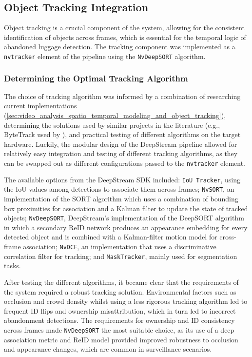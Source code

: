 \subsection{Object Tracking Integration}
\label{sec:object_tracking_integration}

Object tracking is a crucial component of the system, allowing for the
consistent identification of objects across frames, which is essential for the
temporal logic of abandoned luggage detection. The tracking component was
implemented as a \texttt{nvtracker} element of the pipeline using the
\texttt{NvDeepSORT} algorithm.

\subsubsection{Determining the Optimal Tracking Algorithm}
\label{sec:tracker_selection}

The choice of tracking algorithm was informed by a combination of researching
current implementations
(\ref{sec:video_analysis_spatio_temporal_modeling_and_object_tracking}),
determining the solutions used by similar projects in the literature (e.g.,
ByteTrack \citep{zhang2022bytetrack} used by \citet{abandoned2025vrsalovic}),
and practical testing of different algorithms on the target hardware. Luckily,
the modular design of the DeepStream pipeline allowed for relatively easy
integration and testing of different tracking algorithms, as they can be
swapped out as different configurations passed to the \texttt{nvtracker}
element.

The available options from the DeepStream SDK included: \texttt{IoU Tracker},
using the IoU values among detections to associate them across frames;
\texttt{NvSORT}, an implementation of the SORT algorithm
\citep{bewley2016simple} which uses a combination of bounding box proximities
for association and a Kalman filter to update the state of tracked objects;
\texttt{NvDeepSORT}, DeepStream's implementation of the DeepSORT algorithm
\citep{wojke2017simple} in which a secondary ReID network produces an
appearance embedding for every detected object and is combined with a
Kalman-filter motion model for cross-frame association; \texttt{NvDCF}, an
implementation that uses a discriminative correlation filter for tracking; and
\texttt{MaskTracker}, mainly used for segmentation tasks.

After testing the different algorithms, it became clear that the requirements
of the system required a robust tracking solution. Environmental factors such
as occlusion and crowd density whilst using a less rigorous tracking algorithm
led to frequent ID flips and ownership misattribution, which in turn led to
incorrect abandonment detections. The requirements for ownership and ID
consistency across frames made \texttt{NvDeepSORT} the most suitable choice, as
its use of a deep association metric and ReID model provided improved
robustness to occlusion and appearance changes, which are common in
surveillance scenarios.

